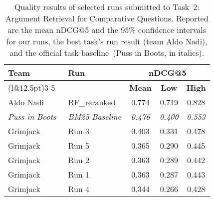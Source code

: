 \begin{table}[t]
\centering
\small
\renewcommand{\tabcolsep}{12.5pt}
\caption{Quality results of selected runs submitted to Task~2: Argument Retrieval for Comparative Questions. Reported are the mean nDCG@5 and the 95\% confidence intervals for our runs, the best task's run result (team Aldo Nadi), and the official task baseline~(Puss in Boots, in italics).}
\label{table-results-quality}
\begin{tabular}{@{}llccc@{}}
\toprule
\textbf{Team} & \textbf{Run} & \multicolumn{3}{c}{\textbf{nDCG@5}} \\
\cmidrule(l@{\tabcolsep}){3-5}
&  & \textbf{Mean} & \textbf{Low} & \textbf{High} \\
\midrule
Aldo Nadi~\cite{AbaAGMPVF2022} & RF\_reranked & 0.774 & 0.719 & 0.828 \\
\textit{Puss in Boots}~\cite{BondarenkoFKSGBPBSWPH2022} & \textit{BM25-Baseline} & \textit{0.476} & \textit{0.400} & \textit{0.553} \\
Grimjack & Run 3 & 0.403 & 0.331 & 0.478 \\
Grimjack & Run 5 & 0.365 & 0.290 & 0.445 \\
Grimjack & Run 2 & 0.363 & 0.289 & 0.442 \\
Grimjack & Run 1 & 0.363 & 0.287 & 0.443 \\
Grimjack & Run 4 & 0.344 & 0.266 & 0.428 \\
\bottomrule
\end{tabular}
\end{table}
